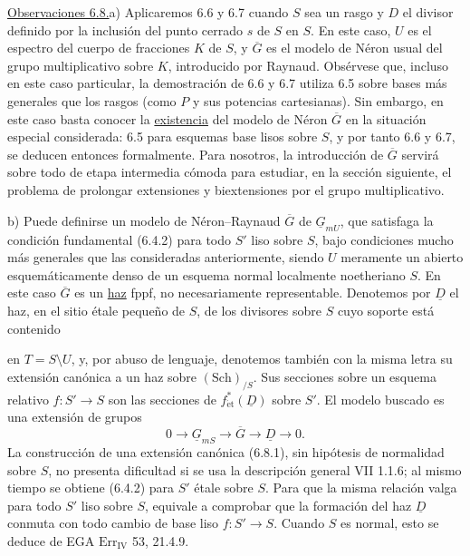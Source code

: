 
\medskip
\noindent\underline{Observaciones 6.8.}\quad a) Aplicaremos 6.6 y 6.7
cuando $S$ sea un rasgo y $D$ el divisor definido por la inclusión del
punto cerrado $s$ de $S$ en $S$. En este caso, $U$ es el espectro del
cuerpo de fracciones $K$ de $S$, y $\overline G$ es el modelo de Néron
usual del grupo multiplicativo sobre $K$, introducido por Raynaud.
Obsérvese que, incluso en este caso particular, la demostración de 6.6
y 6.7 utiliza 6.5 sobre bases más generales que los rasgos (como $P$ y
sus potencias cartesianas). Sin embargo, en este caso basta conocer la
\underline{existencia} del modelo de Néron $\overline G$ en la
situación especial considerada: 6.5 para esquemas base lisos sobre
$S$, y por tanto 6.6 y 6.7, se deducen entonces formalmente. Para
nosotros, la introducción de $\overline G$ servirá sobre todo de etapa
intermedia cómoda para estudiar, en la sección siguiente, el problema
de prolongar extensiones y biextensiones por el grupo multiplicativo.

\smallskip
\noindent b) Puede definirse un modelo de Néron--Raynaud $\overline G$
de $\underline G_{mU}$, que satisfaga la condición fundamental (6.4.2)
para todo $S'$ liso sobre $S$, bajo condiciones mucho más generales
que las consideradas anteriormente, siendo $U$ meramente un abierto
esquemáticamente denso de un esquema normal localmente noetheriano
$S$. En este caso $\overline G$ es un \underline{haz} fppf, no
necesariamente representable. Denotemos por $\underline D$ el haz, en
el sitio étale pequeño de $S$, de los divisores sobre $S$ cuyo soporte
está contenido


en $T=S\setminus U$, y, por abuso de lenguaje, denotemos también con
la misma letra su extensión canónica a un haz sobre
$(\mathrm{Sch})_{/S}$. Sus secciones sobre un esquema relativo
$f:S'\to S$ son las secciones de
$f_{\mathrm{\acute{e}t}}^*(\underline D)$ sobre $S'$. El modelo buscado
es una extensión de grupos
\begin{equation}\tag{6.8.1}
 0\longrightarrow\underline G_{mS}\longrightarrow\overline G
 \longrightarrow\underline D\longrightarrow0.
\end{equation}
La construcción de una extensión canónica (6.8.1), sin hipótesis de
normalidad sobre $S$, no presenta dificultad si se usa la descripción
general VII 1.1.6; al mismo tiempo se obtiene (6.4.2) para $S'$ étale
sobre $S$. Para que la misma relación valga para todo $S'$ liso sobre
$S$, equivale a comprobar que la formación del haz $\underline D$
conmuta con todo cambio de base liso $f:S'\to S$. Cuando $S$ es normal,
esto se deduce de EGA $\mathrm{Err}_{\mathrm{IV}}$ 53, 21.4.9.

